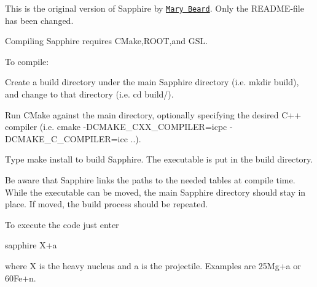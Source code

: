 This is the original version of Sapphire by \href{https://isnap.nd.edu/people/group-pages/mary-beard/}{\tt Mary Beard}. Only the R\-E\-A\-D\-M\-E-\/file has been changed.

Compiling Sapphire requires C\-Make,R\-O\-O\-T,and G\-S\-L.

To compile\-:


\begin{DoxyEnumerate}
\item Create a build directory under the main Sapphire directory (i.\-e. mkdir build), and change to that directory (i.\-e. cd build/).
\item Run C\-Make against the main directory, optionally specifying the desired C++ compiler (i.\-e. cmake -\/\-D\-C\-M\-A\-K\-E\-\_\-\-C\-X\-X\-\_\-\-C\-O\-M\-P\-I\-L\-E\-R=icpc -\/\-D\-C\-M\-A\-K\-E\-\_\-\-C\-\_\-\-C\-O\-M\-P\-I\-L\-E\-R=icc ..).
\item Type make install to build Sapphire. The executable is put in the build directory.
\end{DoxyEnumerate}

Be aware that Sapphire links the paths to the needed tables at compile time. While the executable can be moved, the main Sapphire directory should stay in place. If moved, the build process should be repeated.

To execute the code just enter

sapphire X+a

where X is the heavy nucleus and a is the projectile. Examples are 25\-Mg+a or 60\-Fe+n. 